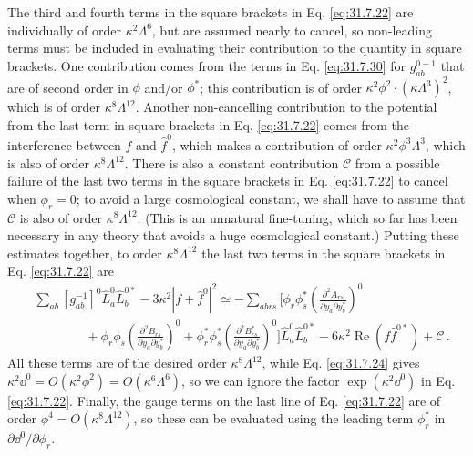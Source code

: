 The third and fourth terms in the square brackets in
Eq. \eqref{eq:31.7.22} are individually of order
\(\kappa^2\Lambda^6\), but are assumed nearly to cancel, so non-leading
terms must be included in evaluating their contribution to the quantity in
square brackets. One contribution comes from the terms in
Eq. \eqref{eq:31.7.30} for \(g_{ab}^{0-1}\) that are of second order in
\(\phi\) and/or \(\phi^*\); this contribution is of order
\(\kappa^2\phi^2\cdot(\kappa\Lambda^3)^2\), which is of order
\(\kappa^8\Lambda^{12}\). Another non-cancelling contribution to the
potential from the last term in square brackets in Eq. \eqref{eq:31.7.22}
comes from the interference between \(f\) and \(\widehat f^0\), which makes
a contribution of order \(\kappa^2\phi^3\Lambda^3\), which is also of order
\(\kappa^8\Lambda^{12}\). There is also a constant contribution
\(\mathcal C\) from a possible failure of the last two terms in the square
brackets in Eq. \eqref{eq:31.7.22} to cancel when \(\phi_r=0\); to avoid a
large cosmological constant, we shall have to assume that \(\mathcal C\) is
also of order \(\kappa^8\Lambda^{12}\). (This is an unnatural fine-tuning,
which so far has been necessary in any theory that avoids a huge
cosmological constant.) Putting these estimates together, to order
\(\kappa^8\Lambda^{12}\) the last two terms in the square brackets in
Eq. \eqref{eq:31.7.22} are
\begin{equation}
  \begin{aligned}
  &\sum_{ab}[g_{ab}^{-1}]^0\widehat L_a^0\widehat L_b^{0*}
  -3\kappa^2|f+\widehat f^0|^2
  \simeq
  -\sum_{abrs}\Biggl[
    \phi_r\phi_s^*
    \left(\frac{\partial^2A_{rs}}
      {\partial y_a\partial y_b^*}\right)^0
  \\
  &\qquad\qquad
  +\phi_r\phi_s
    \left(\frac{\partial^2B_{rs}}
      {\partial y_a\partial y_b^*}\right)^0
  +\phi_r^*\phi_s^*
    \left(\frac{\partial^2B_{rs}^*}
      {\partial y_a\partial y_b^*}\right)^0
  \Biggr]\widehat L_a^0\widehat L_b^{0*}
  -6\kappa^2\operatorname{Re}(f\widehat f^{0*})+\mathcal C\,.
  \end{aligned}
  \tag{31.7.39}\label{eq:31.7.39}
\end{equation}
All these terms are of the desired order \(\kappa^8\Lambda^{12}\), while
Eq. \eqref{eq:31.7.24} gives
\(\kappa^2\dd^0=O(\kappa^2\phi^2)=O(\kappa^6\Lambda^6)\), so we can ignore the
factor \(\exp(\kappa^2\dd^0)\) in Eq. \eqref{eq:31.7.22}. Finally, the gauge
terms on the last line of Eq. \eqref{eq:31.7.22} are of order
\(\phi^4=O(\kappa^8\Lambda^{12})\), so these can be evaluated using the
leading term \(\phi_r^*\) in \(\partial \dd^0/\partial\phi_r\).

